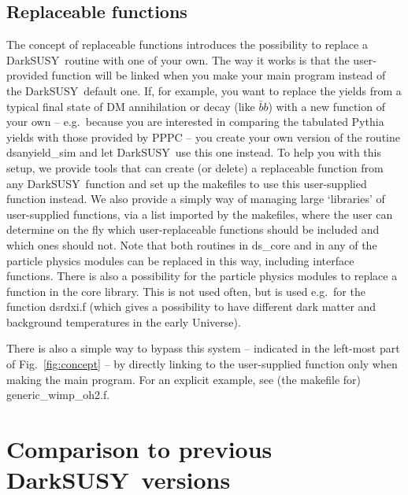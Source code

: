 \documentclass[a4paper,10pt,oneside]{book}
\newcommand{\code}[1]{\ft{#1}}
\newcommand{\ds}{{\sffamily DarkSUSY}}
\newcommand{\ft}[1]{\textsf{#1}}
\begin{document}
\section{Replaceable functions}
\label{sec:replaceable}
The concept of replaceable functions introduces the possibility to replace a \ds\ routine with one of your own. The way it works is that the user-provided function will be linked 
when you make your main program instead of the \ds\ default one. If, for example, you want to 
replace the yields from a typical final state of DM annihilation or decay (like $\bar bb$)
with a new function of your own -- e.g.~because you are interested in comparing the tabulated
{\sf Pythia} \cite{Sjostrand:2006za} yields with those provided by PPPC \cite{Cirelli:2010xx} --  
you create your own version of the routine \code{dsanyield\_sim} and let \ds\ use this one 
instead.  To help you with this setup, 
we provide tools that can create (or delete) a replaceable function from any \ds\ function 
and set up the makefiles to use this user-supplied function instead. We also provide a
simply way of managing large `libraries' of user-supplied functions, via a list imported 
by the makefiles, where the user can determine on the fly which user-replaceable 
functions should be included and which ones should not.  Note that both routines in 
\code{ds\_core} and in any of the particle physics modules can be replaced in this way,
including interface functions. There is also a possibility for the particle physics modules to replace a
function in the core library. This is not used often, but is used e.g.\ for the function \code{dsrdxi.f} (which gives a possibility to have different dark matter and background temperatures in the early Universe).

There is also a simple way to bypass this system  -- indicated in the left-most part of Fig.~\ref{fig:concept} --
by directly linking to the user-supplied function only when making the main program. 
 For an explicit example, see (the makefile for) \code{generic\_wimp\_oh2.f}.

\chapter{Comparison to previous \ds\ versions}
\label{ch:translation}
\end{document}
